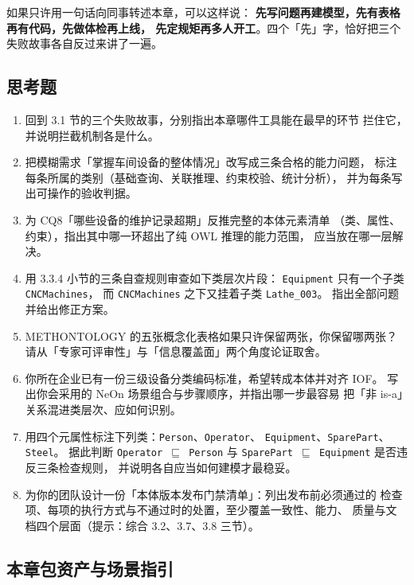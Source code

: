 如果只许用一句话向同事转述本章，可以这样说：
\textbf{先写问题再建模型，先有表格再有代码，先做体检再上线，
先定规矩再多人开工}。四个「先」字，恰好把三个失败故事各自反过来讲了一遍。

\subsection*{思考题}

\begin{enumerate}
  \item 回到 3.1 节的三个失败故事，分别指出本章哪件工具能在最早的环节
        拦住它，并说明拦截机制各是什么。
  \item 把模糊需求「掌握车间设备的整体情况」改写成三条合格的能力问题，
        标注每条所属的类别（基础查询、关联推理、约束校验、统计分析），
        并为每条写出可操作的验收判据。
  \item 为 CQ8「哪些设备的维护记录超期」反推完整的本体元素清单
        （类、属性、约束），指出其中哪一环超出了纯 OWL 推理的能力范围，
        应当放在哪一层解决。
  \item 用 3.3.4 小节的三条自查规则审查如下类层次片段：
        \texttt{Equipment} 只有一个子类 \texttt{CNCMachines}，
        而 \texttt{CNCMachines} 之下又挂着子类 \texttt{Lathe\_003}。
        指出全部问题并给出修正方案。
  \item METHONTOLOGY 的五张概念化表格如果只许保留两张，你保留哪两张？
        请从「专家可评审性」与「信息覆盖面」两个角度论证取舍。
  \item 你所在企业已有一份三级设备分类编码标准，希望转成本体并对齐 IOF。
        写出你会采用的 NeOn 场景组合与步骤顺序，并指出哪一步最容易
        把「非 is-a」关系混进类层次、应如何识别。
  \item 用四个元属性标注下列类：\texttt{Person}、\texttt{Operator}、
        \texttt{Equipment}、\texttt{SparePart}、\texttt{Steel}。
        据此判断 \texttt{Operator \(\sqsubseteq\) Person} 与
        \texttt{SparePart \(\sqsubseteq\) Equipment} 是否违反三条检查规则，
        并说明各自应当如何建模才最稳妥。
  \item 为你的团队设计一份「本体版本发布门禁清单」：列出发布前必须通过的
        检查项、每项的执行方式与不通过时的处置，至少覆盖一致性、能力、
        质量与文档四个层面（提示：综合 3.2、3.7、3.8 三节）。
\end{enumerate}

\subsection*{本章包资产与场景指引}


